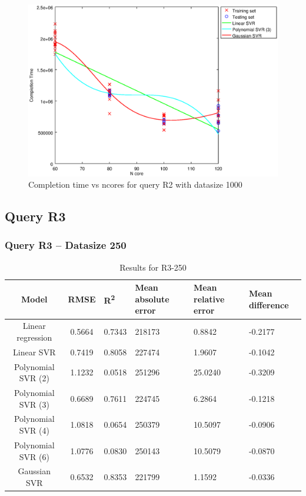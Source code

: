 \documentclass[a4paper,11pt]{article}
\begin{document}
\begin {figure}[hbtp]
\centering
\includegraphics[width=\textwidth]{output/R2_1000_ONLY_1_LINEAR_NCORE/plot_R2_1000_bestmodels.eps}
\caption{Completion time vs ncores for query R2 with datasize 1000}
\label{fig:coreonly_linear_R2_1000}
\end {figure}

\newpage
\subsection{Query R3}
\subsubsection{Query R3 -- Datasize 250}
\begin{table}[H]
	\centering
	\begin{adjustbox}{center}
		\begin{tabular}{c | c M{1.2cm} M{2.5cm} M{2.5cm} M{1.8cm}}
			Model & RMSE & R\textsuperscript{2} & Mean absolute error & Mean relative error & Mean difference \tabularnewline
			\hline
			Linear regression & 0.5664 & 0.7343 & 218173 & 0.8842 & -0.2177 \\
			Linear SVR & 0.7419 & 0.8058 & 227474 & 1.9607 & -0.1042 \\
			Polynomial SVR (2) & 1.1232 & 0.0518 & 251296 & 25.0240 & -0.3209 \\
			Polynomial SVR (3) & 0.6689 & 0.7611 & 224745 & 6.2864 & -0.1218 \\
			Polynomial SVR (4) & 1.0818 & 0.0654 & 250379 & 10.5097 & -0.0906 \\
			Polynomial SVR (6) & 1.0776 & 0.0830 & 250143 & 10.5079 & -0.0870 \\
			Gaussian SVR & 0.6532 & 0.8353 & 221799 & 1.1592 & -0.0336 \\
		\end{tabular}
	\end{adjustbox}
	\\
	\caption{Results for R3-250}
	\label{fig:coreonly_linear_R3_250}
\end{table}
\end{document}
